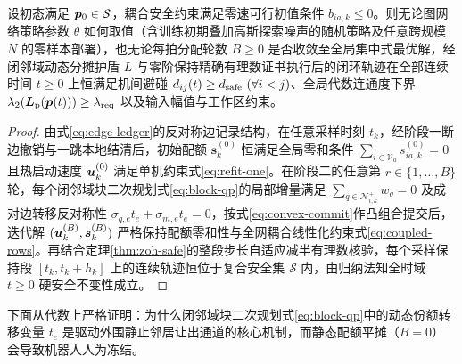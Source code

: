 \begin{proposition}[学习探索与有限轮跨规模执行的随时硬安全不变性]\label{prop:safety}
设初态满足 $\boldsymbol{p}_0\in\mathcal S$，耦合安全约束满足零速可行初值条件 $b_{ia,k}\le 0$。则无论图网络策略参数 $\theta$ 如何取值（含训练初期叠加高斯探索噪声的随机策略及任意跨规模 $N$ 的零样本部署），也无论每拍分配轮数 $B\ge 0$ 是否收敛至全局集中式最优解，经闭邻域动态分摊护盾 $L$ 与零阶保持精确有理数证书执行后的闭环轨迹在全部连续时间 $t\ge 0$ 上恒满足机间避碰 $d_{ij}(t)\ge d_{\mathrm{safe}}\ (\forall i<j)$、全局代数连通度下界 $\lambda_2(\boldsymbol{L}_{\mathrm{p}}(\boldsymbol{p}(t)))\ge\lambda_{\mathrm{req}}$ 以及输入幅值与工作区约束。
\end{proposition}
\begin{proof}
由式\eqref{eq:edge-ledger}的反对称边记录结构，在任意采样时刻 $t_k$，经阶段一断边撤销与一跳本地结清后，初始配额 $\boldsymbol s_k^{(0)}$ 恒满足全局零和条件 $\sum_{i\in\mathcal V_a}s_{ia,k}^{(0)}=0$ 且热启动速度 $\boldsymbol{u}_k^{(0)}$ 满足单机约束式\eqref{eq:refit-one}。在阶段二的任意第 $r\in\{1,\dots,B\}$ 轮，每个闭邻域块二次规划式\eqref{eq:block-qp}的局部增量满足 $\sum_{q\in\mathcal N_{i,k}^+}w_q=0$ 及成对边转移反对称性 $\sigma_{q,e}t_e+\sigma_{m,e}t_e=0$，按式\eqref{eq:convex-commit}作凸组合提交后，迭代解 $(\boldsymbol{u}_k^{(B)},\boldsymbol s_k^{(B)})$ 严格保持配额零和性与全网耦合线性化约束式\eqref{eq:coupled-rows}。再结合定理\ref{thm:zoh-safe}的整段步长自适应减半有理数核验，每个采样保持段 $[t_k,t_k+h_k]$ 上的连续轨迹恒位于复合安全集 $\mathcal S$ 内，由归纳法知全时域 $t\ge 0$ 硬安全不变性成立。
\end{proof}

下面从代数上严格证明：为什么闭邻域块二次规划式\eqref{eq:block-qp}中的动态份额转移变量 $t_e$ 是驱动外围静止邻居让出通道的核心机制，而静态配额平摊（$B=0$）会导致机器人人为冻结。

